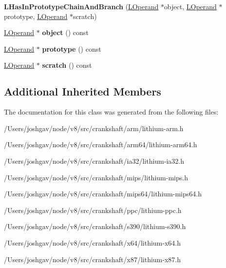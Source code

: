 \begin{DoxyCompactItemize}
\item 
{\bfseries L\+Has\+In\+Prototype\+Chain\+And\+Branch} (\hyperlink{classv8_1_1internal_1_1_l_operand}{L\+Operand} $\ast$object, \hyperlink{classv8_1_1internal_1_1_l_operand}{L\+Operand} $\ast$prototype, \hyperlink{classv8_1_1internal_1_1_l_operand}{L\+Operand} $\ast$scratch)\hypertarget{classv8_1_1internal_1_1_l_has_in_prototype_chain_and_branch_a6ae8ccffa4e36d7001700a38a921b5f2}{}\label{classv8_1_1internal_1_1_l_has_in_prototype_chain_and_branch_a6ae8ccffa4e36d7001700a38a921b5f2}

\item 
\hyperlink{classv8_1_1internal_1_1_l_operand}{L\+Operand} $\ast$ {\bfseries object} () const \hypertarget{classv8_1_1internal_1_1_l_has_in_prototype_chain_and_branch_a495e5c90fae5975c86c05b81abc64eb7}{}\label{classv8_1_1internal_1_1_l_has_in_prototype_chain_and_branch_a495e5c90fae5975c86c05b81abc64eb7}

\item 
\hyperlink{classv8_1_1internal_1_1_l_operand}{L\+Operand} $\ast$ {\bfseries prototype} () const \hypertarget{classv8_1_1internal_1_1_l_has_in_prototype_chain_and_branch_a064d5fd47ecfd5cadfaf5453641d0217}{}\label{classv8_1_1internal_1_1_l_has_in_prototype_chain_and_branch_a064d5fd47ecfd5cadfaf5453641d0217}

\item 
\hyperlink{classv8_1_1internal_1_1_l_operand}{L\+Operand} $\ast$ {\bfseries scratch} () const \hypertarget{classv8_1_1internal_1_1_l_has_in_prototype_chain_and_branch_a6f1cd6c0894efda40cecf24852d48c0d}{}\label{classv8_1_1internal_1_1_l_has_in_prototype_chain_and_branch_a6f1cd6c0894efda40cecf24852d48c0d}

\end{DoxyCompactItemize}
\subsection*{Additional Inherited Members}


The documentation for this class was generated from the following files\+:\begin{DoxyCompactItemize}
\item 
/\+Users/joshgav/node/v8/src/crankshaft/arm/lithium-\/arm.\+h\item 
/\+Users/joshgav/node/v8/src/crankshaft/arm64/lithium-\/arm64.\+h\item 
/\+Users/joshgav/node/v8/src/crankshaft/ia32/lithium-\/ia32.\+h\item 
/\+Users/joshgav/node/v8/src/crankshaft/mips/lithium-\/mips.\+h\item 
/\+Users/joshgav/node/v8/src/crankshaft/mips64/lithium-\/mips64.\+h\item 
/\+Users/joshgav/node/v8/src/crankshaft/ppc/lithium-\/ppc.\+h\item 
/\+Users/joshgav/node/v8/src/crankshaft/s390/lithium-\/s390.\+h\item 
/\+Users/joshgav/node/v8/src/crankshaft/x64/lithium-\/x64.\+h\item 
/\+Users/joshgav/node/v8/src/crankshaft/x87/lithium-\/x87.\+h\end{DoxyCompactItemize}
